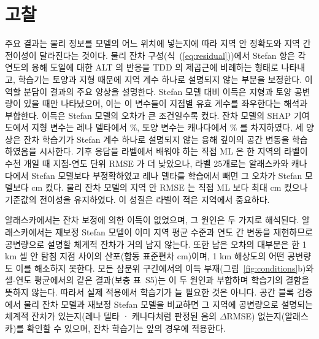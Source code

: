 \section{고찰}\label{sec:discussion}

주요 결과는 물리 정보를 모델의 어느 위치에 넣는지에 따라 지역 안 정확도와 지역 간 전이성이 달라진다는 것이다. 물리 잔차 구성(식~(\ref{eq:residual}))에서 Stefan 항은 각 연도의 융해 도일에 대한 ALT 의 반응을 TDD 의 제곱근에 비례하는 형태로 나타내고, 학습기는 토양과 지형 때문에 지역 계수 하나로 설명되지 않는 부분을 보정한다. 이 역할 분담이 결과의 주요 양상을 설명한다. Stefan 모델 대비 이득은 지형과 토양 공변량이 있을 때만 나타났으며, 이는 이 변수들이 지점별 유효 계수를 좌우한다는 해석과 부합한다. 이득은 Stefan 모델의 오차가 큰 조건일수록 컸다. 잔차 모델의 SHAP 기여도에서 지형 변수는 레나 델타에서 \nshapLeResTerrain\%, 토양 변수는 캐나다에서 \nshapCaResSoil\% 를 차지하였다. 세 양상은 잔차 학습기가 Stefan 계수 하나로 설명되지 않는 융해 깊이의 공간 변동을 학습하였음을 시사한다. 기후 응답을 라벨에서 배워야 하는 직접 ML 은 한 지역의 라벨이 수천 개일 때 지점-연도 단위 RMSE 가 더 낮았으나, 라벨 25개로는 알래스카와 캐나다에서 Stefan 모델보다 부정확하였고 레나 델타를 학습에서 빼면 그 오차가 Stefan 모델보다 \ndrefLeregDzabs{} cm 컸다. 물리 잔차 모델의 지역 안 RMSE 는 직접 ML 보다 최대 \ndrefRoDzblkmax{} cm 컸으나 기준값의 전이성을 유지하였다. 이 성질은 라벨이 적은 지역에서 중요하다.

알래스카에서는 잔차 보정에 의한 이득이 없었으며, 그 원인은 두 가지로 해석된다. 알래스카에서는 재보정 Stefan 모델이 이미 지역 평균 수준과 연도 간 변동을 재현하므로 공변량으로 설명할 체계적 잔차가 거의 남지 않는다. 또한 남은 오차의 대부분은 한 1 km 셀 안 탐침 지점 사이의 산포(합동 표준편차 \ncyWithinSdAk{} cm)이며, 1 km 해상도의 어떤 공변량도 이를 해소하지 못한다. 모든 삼분위 구간에서의 이득 부재(그림~\ref{fig:conditions}b)와 셀-연도 평균에서의 같은 결과(보충 표~S5)는 이 두 원인과 부합하며 학습기의 결함을 뜻하지 않는다. 따라서 실제 적용에서 학습기가 늘 필요한 것은 아니다. 공간 블록 검증에서 물리 잔차 모델과 재보정 Stefan 모델을 비교하면 그 지역에 공변량으로 설명되는 체계적 잔차가 있는지(레나 델타 · 캐나다처럼 판정된 음의 $\Delta$RMSE) 없는지(알래스카)를 확인할 수 있으며, 잔차 학습기는 앞의 경우에 적용한다.

